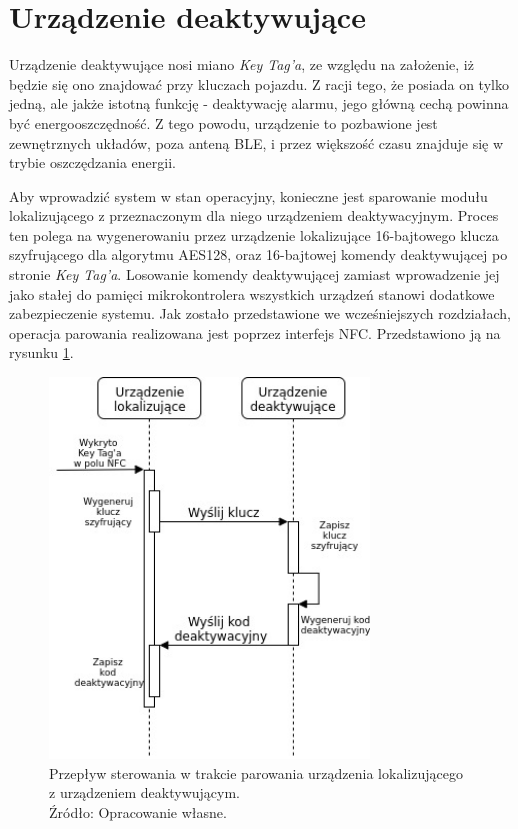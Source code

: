 \section{Urządzenie deaktywujące}
\label{key_tag}

Urządzenie deaktywujące nosi miano \textit{Key Tag'a}, ze względu na założenie, iż będzie się ono znajdować przy kluczach pojazdu. Z racji tego, że posiada on tylko jedną, ale jakże istotną funkcję - deaktywację alarmu, jego główną cechą powinna być energooszczędność. Z tego powodu, urządzenie to  pozbawione jest zewnętrznych układów, poza anteną BLE, i przez większość czasu znajduje się w trybie oszczędzania energii. 

Aby wprowadzić system w stan operacyjny, konieczne jest sparowanie modułu lokalizującego z przeznaczonym dla niego urządzeniem deaktywacyjnym. Proces ten polega na wygenerowaniu przez urządzenie lokalizujące 16-bajtowego klucza szyfrującego dla algorytmu AES128, oraz 16-bajtowej komendy deaktywującej po stronie \textit{Key Tag'a}. Losowanie komendy deaktywującej zamiast wprowadzenie jej jako stałej do pamięci mikrokontrolera wszystkich urządzeń stanowi dodatkowe zabezpieczenie systemu. Jak zostało przedstawione we wcześniejszych rozdziałach, operacja parowania realizowana jest poprzez interfejs NFC. Przedstawiono ją na rysunku \ref{fig:image_soft_keytag_key exchange}.

\begin{figure}[H]
	\centering
	\includegraphics[width=8.5cm]{img/software/keytag/Key_exchange.jpg}
	\caption{Przepływ sterowania w trakcie parowania urządzenia lokalizującego z urządzeniem deaktywującym. 
	\\Źródło: Opracowanie własne.}
	\label{fig:image_soft_keytag_key exchange}
\end{figure}

